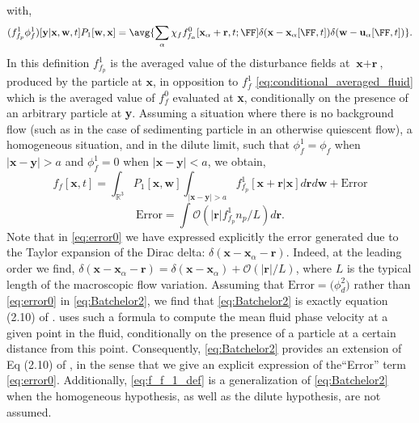 with, 
\begin{equation}
    (f_{f_p}^1 \phi_f^1) [\textbf{y}|\textbf{x},\textbf{w},t] P_1[\textbf{w},\textbf{x}]
    = 
    \avg{
    \sum_\alpha
    \chi_f f_{f_\alpha}^0[\textbf{x}_\alpha + \textbf{r},t;\FF] 
    \delta(\textbf{x} - \textbf{x}_\alpha[\FF,t])
    \delta(\textbf{w} - \textbf{u}_\alpha[\FF,t])
    }. 
\end{equation}
In this definition $f_{f_p}^1$ is the averaged value of the disturbance fields at $\textbf{x}+\textbf{r}$, produced by the particle at $\textbf{x}$, in opposition to $f_f^1$ \eqref{eq:conditional_averaged_fluid} which is the averaged value of $f_f^0$ evaluated at \textbf{x}, conditionally on the presence of an arbitrary particle at \textbf{y}.
Assuming a situation where there is no background flow (such as in the case of sedimenting particle in an otherwise quiescent flow), a homogeneous situation, and in the dilute limit, such that $\phi_f^1 = \phi_f$ when $|\textbf{x}-\textbf{y}|>a$ and $\phi_f^1 =0$ when $|\textbf{x}-\textbf{y}|<a$, we obtain, 
\begin{equation}
    f_f[\textbf{x},t]
    = 
    \int_{\mathbb{R}^3} 
    P_1[\textbf{x},\textbf{w}] 
    \int_{|\textbf{x}-\textbf{y}| >a} 
    f_{f_p}^1[\textbf{x}+ \textbf{r}| \textbf{x}]
    d\textbf{r}
    d\textbf{w}
    + 
    \text{Error}
    \label{eq:Batchelor2}
\end{equation}
\begin{equation}
    \text{Error}
    = 
    \int{
    \mathcal{O}(|\textbf{r}| f_{f_p}^1  n_p / L)
    } d\textbf{r}. 
    \label{eq:error0}
\end{equation}
Note that in \ref{eq:error0} we have expressed explicitly the error generated due to the Taylor expansion of the Dirac delta: $\delta(\textbf{x} - \textbf{x}_\alpha - \textbf{r})$. 
Indeed, at the leading order we find, $\delta(\textbf{x} - \textbf{x}_\alpha - \textbf{r}) =\delta(\textbf{x} - \textbf{x}_\alpha) +  \mathcal{O}(|\textbf{r}|/L)$, where $L$ is the typical length of the macroscopic flow variation.
Assuming that $\text{Error}= \mathcal(\phi_d^2)$ rather than \ref{eq:error0} in \ref{eq:Batchelor2}, we find that \ref{eq:Batchelor2} is exactly equation (2.10) of \citet{batchelor1972sedimentation}. 
\citet{batchelor1972sedimentation} uses such a formula to compute the mean fluid phase velocity at a given point in the fluid, conditionally on the presence of a particle at a certain distance from this point. 
Consequently, \ref{eq:Batchelor2} provides an extension of Eq (2.10) of \citet{batchelor1972sedimentation}, in the sense that we give an explicit expression of the``Error'' term \eqref{eq:error0}. %
Additionally, \ref{eq:f_f_1_def} is a generalization of \ref{eq:Batchelor2} when the homogeneous hypothesis, as well as the dilute hypothesis, are not assumed. 



